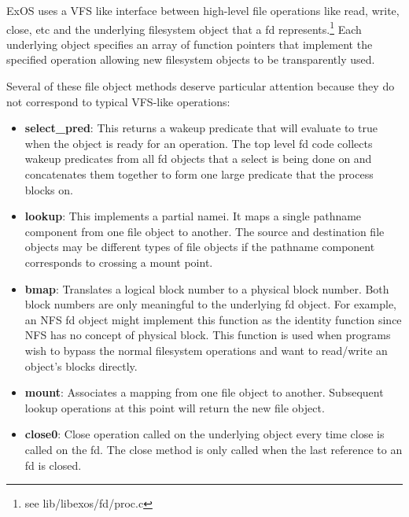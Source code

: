 
ExOS uses a VFS like interface between high-level file operations like
read, write, close, etc and the underlying filesystem object that
a fd represents.\footnote{see lib/libexos/fd/proc.c} Each underlying
object specifies an array of function pointers that implement the
specified operation allowing new filesystem objects to be transparently
used.

Several of these file object methods deserve particular attention
because they do not correspond to typical VFS-like operations:

\begin{itemize}

\item {\bf select\_pred}: This returns a wakeup predicate that will evaluate
to true when the object is ready for an operation. The top level fd code
collects wakeup predicates from all fd objects that a select is being
done on and concatenates them together to form one large predicate
that the process blocks on.

\item {\bf lookup}: This implements a partial namei. It maps a single
pathname component from one file object to another. The source and
destination file objects may be different types of file objects
if the pathname component corresponds to crossing a mount point.

\item {\bf bmap}: Translates a logical block number to a physical
block number. Both block numbers are only meaningful to the
underlying fd object. For example, an NFS fd object might implement
this function as the identity function since NFS has no concept of
physical block. This function is used when programs wish to bypass the
normal filesystem operations and want to read/write an object's blocks
directly.

\item {\bf mount}: Associates a mapping from one file object to another.
Subsequent lookup operations at this point will return the new file
object.

\item {\bf close0}: Close operation called on the underlying object
every time close is called on the fd. The close method is only
called when the last reference to an fd is closed.

\end{itemize}
